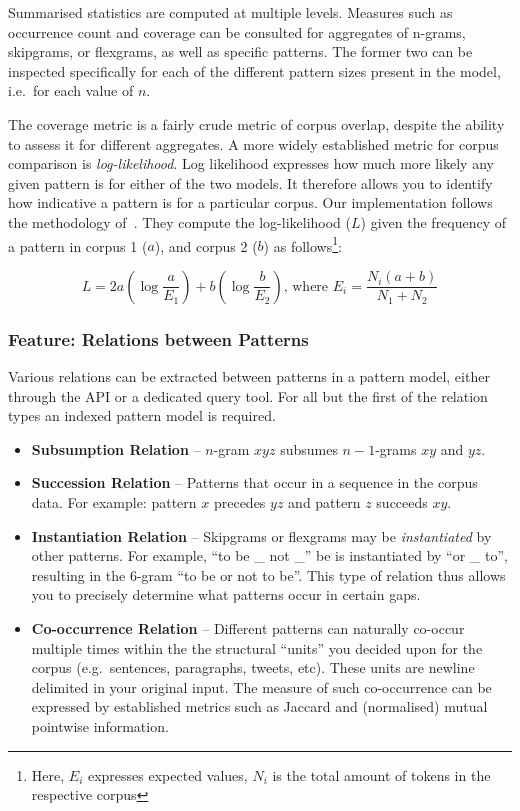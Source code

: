 \documentclass[a4paper,12pt]{article}
\begin{document}
Summarised statistics are computed at multiple levels. Measures such as
occurrence count and coverage can be consulted for aggregates of n-grams,
skipgrams, or flexgrams, as well as specific patterns. The former two can be
inspected specifically for each of the different pattern sizes present in the
model, i.e.\ for each value of $n$.

The coverage metric is a fairly crude metric of corpus overlap, despite the
ability to assess it for different aggregates. A more widely established metric
for corpus comparison is \emph{log-likelihood}. Log likelihood expresses how
much more likely any given pattern is for either of the two models. It
therefore allows you to identify how indicative a pattern is for a particular
corpus. Our implementation follows the methodology
of~\cite{Rayson00comparingcorpora}. They compute the log-likelihood ($L$)
given the frequency of a pattern in corpus 1 ($a$), and corpus 2 ($b$) as
follows\footnote{Here, $E_i$ expresses expected values, $N_i$ is the
total amount of tokens in the respective corpus}:

\begin{equation}
L = 2a(\log \frac{a}{E_1}) + b(\log \frac{b}{E_2})\text{, where } E_i = \frac{N_i(a+b)}{N_1 + N_2} 
\end{equation}


\subsubsection{Feature: Relations between Patterns}

Various relations can be extracted between patterns in a pattern model, either
through the API or a dedicated query tool. For all but the first of the
relation types an indexed pattern model is required. 

\begin{itemize}
 \item \textbf{Subsumption Relation} -- $n$-gram $x y z$ subsumes $n-1$-grams $x y$ and $y z$. 
 \item \textbf{Succession Relation} -- Patterns that occur in a sequence in the
     corpus data. For example: pattern $x$ precedes $yz$ and pattern $z$ succeeds $xy$.
 \item \textbf{Instantiation Relation} -- Skipgrams or flexgrams may be
     \emph{instantiated} by other patterns. For example, ``to be \_ not \_'' be
     is instantiated by ``or \_ to'', resulting in the 6-gram ``to be or not to be''. This type of relation thus allows you to precisely determine what patterns occur in certain gaps.
 \item \textbf{Co-occurrence Relation} -- Different patterns can naturally co-occur multiple times
     within the the structural ``units'' you decided upon for the corpus (e.g.\ 
     sentences, paragraphs, tweets, etc). These units are newline delimited in
     your original input. The measure of such co-occurrence 
     can be expressed by established metrics such as Jaccard and (normalised) mutual
     pointwise information.
\end{itemize}
\end{document}
